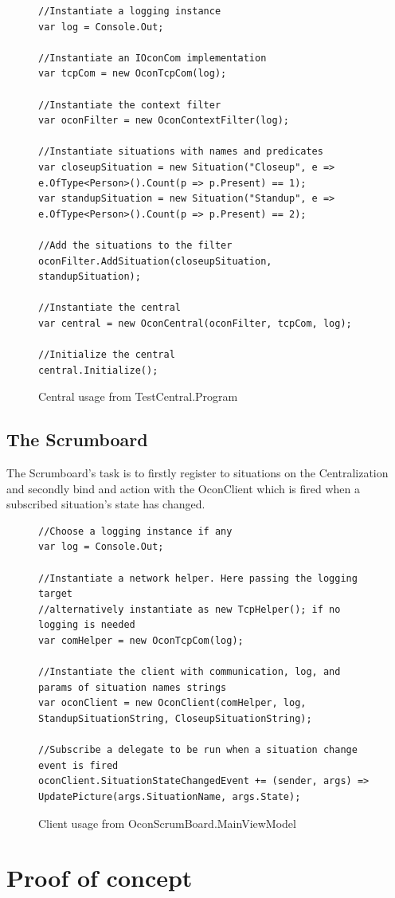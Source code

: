 \documentclass[../report.tex]{subfiles}
\begin{document}
\begin{figure}[H]
\begin{lstlisting}
//Instantiate a logging instance
var log = Console.Out;

//Instantiate an IOconCom implementation
var tcpCom = new OconTcpCom(log);

//Instantiate the context filter
var oconFilter = new OconContextFilter(log);

//Instantiate situations with names and predicates
var closeupSituation = new Situation("Closeup", e => e.OfType<Person>().Count(p => p.Present) == 1);
var standupSituation = new Situation("Standup", e => e.OfType<Person>().Count(p => p.Present) == 2);

//Add the situations to the filter
oconFilter.AddSituation(closeupSituation, standupSituation);

//Instantiate the central
var central = new OconCentral(oconFilter, tcpCom, log);

//Initialize the central
central.Initialize();
\end{lstlisting}
\caption{Central usage from TestCentral.Program}
\label{code:OconCentral}
\end{figure}


\newpage

\subsection{The Scrumboard}

The Scrumboard's task is to firstly register to situations on the Centralization and secondly bind and action with the OconClient which is fired when a subscribed situation's state has changed.

\begin{figure}[H]
\begin{lstlisting}
//Choose a logging instance if any
var log = Console.Out;

//Instantiate a network helper. Here passing the logging target
//alternatively instantiate as new TcpHelper(); if no logging is needed
var comHelper = new OconTcpCom(log);

//Instantiate the client with communication, log, and params of situation names strings
var oconClient = new OconClient(comHelper, log, StandupSituationString, CloseupSituationString);

//Subscribe a delegate to be run when a situation change event is fired
oconClient.SituationStateChangedEvent += (sender, args) => UpdatePicture(args.SituationName, args.State);
\end{lstlisting}
\caption{Client usage from OconScrumBoard.MainViewModel}
\label{code:OconClient}
\end{figure}





\section{Proof of concept}

\end{document}

